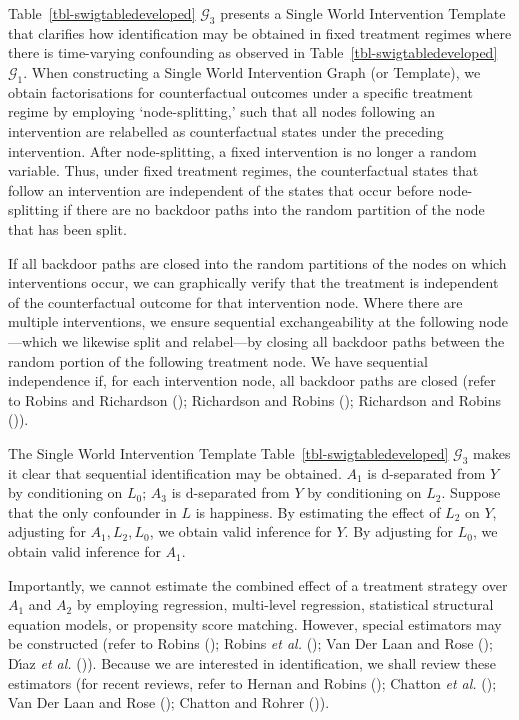 \documentclass[
  single column]{article}
\begin{document}
Table~\ref{tbl-swigtabledeveloped} \(\mathcal{G}_3\) presents a Single
World Intervention Template that clarifies how identification may be
obtained in fixed treatment regimes where there is time-varying
confounding as observed in Table~\ref{tbl-swigtabledeveloped}
\(\mathcal{G}_1\). When constructing a Single World Intervention Graph
(or Template), we obtain factorisations for counterfactual outcomes
under a specific treatment regime by employing `node-splitting,' such
that all nodes following an intervention are relabelled as
counterfactual states under the preceding intervention. After
node-splitting, a fixed intervention is no longer a random variable.
Thus, under fixed treatment regimes, the counterfactual states that
follow an intervention are independent of the states that occur before
node-splitting if there are no backdoor paths into the random partition
of the node that has been split.

If all backdoor paths are closed into the random partitions of the nodes
on which interventions occur, we can graphically verify that the
treatment is independent of the counterfactual outcome for that
intervention node. Where there are multiple interventions, we ensure
sequential exchangeability at the following node---which we likewise
split and relabel---by closing all backdoor paths between the random
portion of the following treatment node. We have sequential independence
if, for each intervention node, all backdoor paths are closed (refer to
Robins and Richardson ();
Richardson and Robins ();
Richardson and Robins ()).

The Single World Intervention Template
Table~\ref{tbl-swigtabledeveloped} \(\mathcal{G}_3\) makes it clear that
sequential identification may be obtained. \(A_1\) is d-separated from
\(Y\) by conditioning on \(L_0\); \(A_3\) is d-separated from \(Y\) by
conditioning on \(L_2\). Suppose that the only confounder in \(L\) is
happiness. By estimating the effect of \(L_2\) on \(Y\), adjusting for
\(A_1, L_2, L_0\), we obtain valid inference for \(Y\). By adjusting for
\(L_0\), we obtain valid inference for \(A_1\).

Importantly, we cannot estimate the combined effect of a treatment
strategy over \(A_1\) and \(A_2\) by employing regression, multi-level
regression, statistical structural equation models, or propensity score
matching. However, special estimators may be constructed (refer to
Robins (); Robins \emph{et al.}
(); Van Der Laan and Rose
(); Dı́az \emph{et al.}
()). Because we are interested
in identification, we shall review these estimators (for recent reviews,
refer to Hernan and Robins ();
Chatton \emph{et al.} (); Van Der Laan
and Rose (); Chatton and Rohrer
()).
\end{document}
